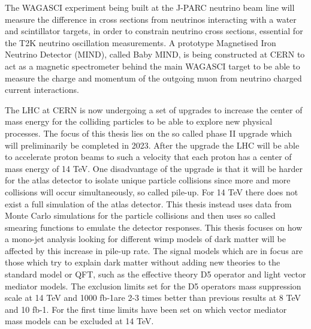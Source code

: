 The WAGASCI experiment being built at the J-PARC neutrino beam line will measure the difference in cross sections from neutrinos interacting with a water and scintillator targets, in order to constrain neutrino cross sections, essential for the T2K neutrino oscillation measurements. A prototype Magnetised Iron Neutrino Detector (MIND), called Baby MIND, is being constructed at CERN to act as a magnetic spectrometer behind the main WAGASCI target to be able to measure the charge and momentum of the outgoing muon from neutrino charged current interactions.


The LHC at CERN is now undergoing a set of upgrades to increase the center of mass energy for the colliding particles to be able to explore new physical processes. The focus of this thesis lies on the so called phase II upgrade which will preliminarily be completed in 2023. After the upgrade the LHC will be able to accelerate proton beams to such a velocity that each proton has a center of mass energy of 14 TeV. One disadvantage of the upgrade is that it will be harder for the atlas detector to isolate unique particle collisions since more and more collisions will occur simultaneously, so called pile-up. For 14 TeV there does not exist a full simulation of the atlas detector. This thesis instead uses data from Monte Carlo simulations for the particle collisions and then uses so called smearing functions to emulate the detector responses. This thesis focuses on how a mono-jet analysis looking for different wimp models of dark matter will be affected by this increase in pile-up rate. The signal models which are in focus are those which try to explain dark matter without adding new theories to the standard model or QFT, such as the effective theory D5 operator and light vector mediator models. The exclusion limits set for the D5 operators mass suppression scale at 14 TeV and 1000 fb-1are 2-3 times better than previous results at 8 TeV and 10 fb-1. For the first time limits have been set on which vector mediator mass models can be excluded at 14 TeV.
\fi



